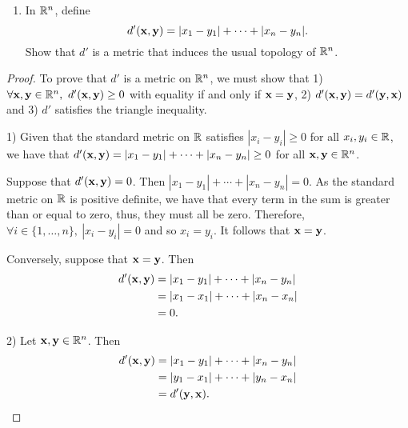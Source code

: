 \begin{solution}
    \begin{enumerate}[label={(\alph*)}, align=left, leftmargin=\parindent, listparindent=\parindent, labelwidth=0pt, itemindent=!]
        \item In $\mathbb{R}^n$, define
        \begin{equation*}
            d'(\mathbf{x}, \mathbf{y}) = |x_1 - y_1| + \cdots + |x_n - y_n|.
        \end{equation*}
        Show that $d'$ is a metric that induces the usual topology of $\mathbb{R}^n$.
    \end{enumerate}
    \begin{proof}
        To prove that $d'$ is a metric on $\mathbb{R}^n$, we must show that 1) $\forall \mathbf{x}, \mathbf{y} \in \mathbb{R}^n,~ d'(\mathbf{x}, \mathbf{y}) \geq 0$ with equality if and only if $\mathbf{x} = \mathbf{y}$, 2) $d'(\mathbf{x}, \mathbf{y}) = d'(\mathbf{y}, \mathbf{x})$ and 3) $d'$ satisfies the triangle inequality.

        1) Given that the standard metric on $\mathbb{R}$ satisfies $|x_i - y_i| \geq 0$ for all $x_i, y_i \in \mathbb{R}$, we have that $d'(\mathbf{x}, \mathbf{y}) = |x_1 - y_1| + \cdots + |x_n - y_n| \geq 0$ for all $\mathbf{x}, \mathbf{y} \in \mathbb{R}^n$.

        Suppose that $d'(\mathbf{x}, \mathbf{y}) = 0$.
        Then $|x_1 - y_1| + \cdots + |x_n - y_n| = 0$.
        As the standard metric on $\mathbb{R}$ is positive definite, we have that every term in the sum is greater than or equal to zero, thus, they must all be zero.
        Therefore, $\forall i \in \{1, \ldots, n\},~ |x_i - y_i| = 0$ and so $x_i = y_i$.
        It follows that $\mathbf{x} = \mathbf{y}$.

        Conversely, suppose that $\mathbf{x} = \mathbf{y}$.
        Then
        \begin{align*}
            d'(\mathbf{x}, \mathbf{y})    &= |x_1 - y_1| + \cdots + |x_n - y_n| \\
                            &= |x_1 - x_1| + \cdots + |x_n - x_n| \\
                            &= 0.
        \end{align*}

        2) Let $\mathbf{x}, \mathbf{y} \in \mathbb{R}^n$.
        Then
        \begin{align*}
            d'(\mathbf{x}, \mathbf{y})    &= |x_1 - y_1| + \cdots + |x_n - y_n| \\
                            &= |y_1 - x_1| + \cdots + |y_n - x_n| \\
                            &= d'(\mathbf{y}, \mathbf{x}).
        \end{align*}


\end{proof}
\end{solution}
